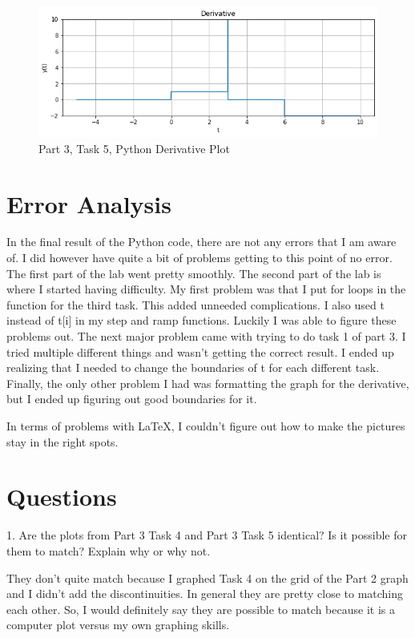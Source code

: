 \documentclass[12pt]{report}
\begin{document}
{\begin{figure}[h!]
\begin{center}
\caption{Part 3, Task 5, Python Derivative Plot}
\includegraphics[scale=0.55]{Task5.png}
\end{center}
\end{figure}
}

\newpage
\newpage
\section{Error Analysis}
In the final result of the Python code, there are not any errors that I am aware of.
I did however have quite a bit of problems getting to this point of no error. The
first part of the lab went pretty smoothly. The second part of the lab is where
I started having difficulty. My first problem was that I put for loops in the
function for the third task. This added unneeded complications. I also used
t instead of t[i] in my step and ramp functions. Luckily I was able to figure
these problems out. The next major problem came with trying to do task 1 of part 3.
I tried multiple different things and wasn't getting the correct result. I ended
up realizing that I needed to change the boundaries of t for each different task.
Finally, the only other problem I had was formatting the graph for the derivative, but I
ended up figuring out good boundaries for it.

In terms of problems with \LaTeX, I couldn't figure out how to make the
pictures stay in the right spots.
\section{Questions}
1. Are the plots from Part 3 Task 4 and Part 3 Task 5 identical? Is it possible for them to
match? Explain why or why not.

They don't quite match because I graphed Task 4 on the grid of the Part 2 graph and
I didn't add the discontinuities. In general they are pretty close to matching each
other. So, I would definitely say they are possible to match because it is a
computer plot versus my own graphing skills.
\end{document}
